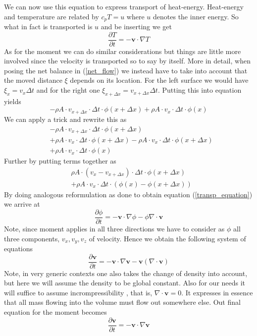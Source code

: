 \documentclass[]{article}
\begin{document}
We can now use this equation to express transport of heat-energy. Heat-energy and temperature are 
related by $c_p T=u$ where $u$ denotes the inner energy. So what in fact is transported is $u$ and be inserting we get
\begin{equation} \label{transp_heat}
\frac{\partial T}{\partial t}=-\textbf{v}\cdot\nabla T
\end{equation}
As for the moment we can do similar considerations but things are little more involved since the velocity is transported so to say by itself. More in detail, when posing the net balance in (\ref{net_flow}) we instead have to take into account that the moved distance $\xi$ depends on its location. For the left surface we would have $\xi_{x}=v_{x}\Delta t$ and for the right one  $\xi_{x+\Delta x}=v_{x+\Delta x}\Delta t$. Putting this into equation yields
\begin{equation*}
-\rho A\cdot v_{x+\Delta x}\cdot\Delta t \cdot \phi(x+\Delta x)+\rho A\cdot v_{x}\cdot\Delta t \cdot \phi(x)
\end{equation*}
We can apply a trick and rewrite this as
\begin{align*}
&-\rho A\cdot v_{x+\Delta x}\cdot\Delta t \cdot \phi(x+\Delta x) \\ &+
\rho A\cdot v_{x}\cdot\Delta t \cdot \phi(x+\Delta x) -
\rho A\cdot v_{x}\cdot\Delta t \cdot \phi(x+\Delta x) \\ &+
\rho A\cdot v_{x}\cdot\Delta t \cdot \phi(x)
\end{align*}
Further by putting terms together as
\begin{align*}
&\rho A\cdot (v_{x}-v_{x+\Delta x})\cdot\Delta t \cdot \phi(x+\Delta x) \\ &+
\rho A\cdot v_{x}\cdot\Delta t \cdot (\phi(x)-\phi(x+\Delta x))
\end{align*}
By doing analogous reformulation as done to obtain equation (\ref{transp_equation}) we arrive at
\begin{equation*}
\frac{\partial\phi}{\partial t}=-\textbf{v}\cdot\nabla\phi-\phi\nabla\cdot\textbf{v}
\end{equation*}
Note, since moment applies in all three directions we have to consider as $\phi$ all three components, $v_x, v_y, v_z$ of velocity. Hence we obtain the following system of equations
\begin{equation*}
\frac{\partial\textbf{v}}{\partial t}=-\textbf{v}\cdot\nabla\textbf{v}-\textbf{v}(\nabla\cdot\textbf{v})
\end{equation*}
Note, in very generic contexts one also takes the change of density into account, but here we will assume the density to be global constant.
Also for our needs it will suffice to assume incrompressibility , that is, $\nabla\cdot\textbf{v}=0$. It expresses in essence that all mass flowing into the volume must flow out somewhere else.
Out final equation for the moment becomes
\begin{equation} \label{moment_transp_final}
\frac{\partial\textbf{v}}{\partial t}=-\textbf{v}\cdot\nabla\textbf{v}
\end{equation}
\end{document}
